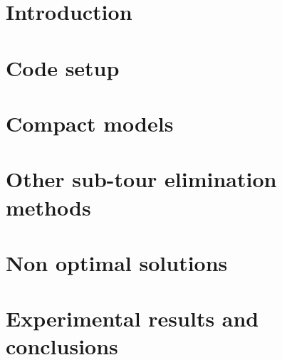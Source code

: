 
\thispagestyle{empty}

%

\tableofcontents %

\clearpage{\pagestyle{plain}\cleardoublepage} %


\chapter{Introduction} %
\label{chapter:primo_capitolo} %

\chapter{Code setup}
\label{chapter:code-setup}


\chapter{Compact models} 
\label{chapter:compact-models} 
 

\clearpage{\pagestyle{plain}\cleardoublepage}
\chapter{Other sub-tour elimination methods} 
\label{chapter:other-sec} 
 

\clearpage{\pagestyle{plain}\cleardoublepage}
\chapter{Non optimal solutions} 
\label{chapter:codice} 


\chapter{Experimental results and conclusions}
\label{chapter:results}


\clearpage{\pagestyle{plain}\cleardoublepage}


